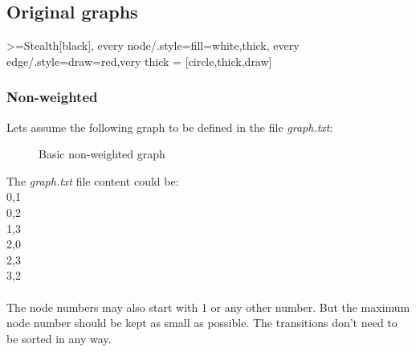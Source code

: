 \documentclass[12pt,a4paper]{article}
\begin{document}
	\subsection{Original graphs}
		\tikzset
		{
			>={Stealth[black]},
			every node/.style={fill=white,thick},
			every edge/.style={draw=red,very thick}
		}
		 = [circle,thick,draw]
		\subsubsection{Non-weighted}
			Lets assume the following graph to be defined in the file \textit{graph.txt}:
			\begin{figure}[H]
				\centering
				\caption{Basic non-weighted graph} \label{fig:nwGraph}
			\end{figure}
			The \textit{graph.txt} file content could be:\\
			0,1\\0,2\\1,3\\2,0\\2,3\\3,2
			\\\\
			The node numbers may also start with 1 or any other number. But the maximum node number should be kept as small as possible. The transitions don't need to be sorted in any way.
\end{document}
